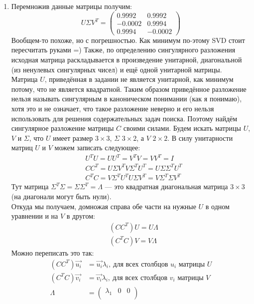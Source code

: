 \begin{solution}
\begin{enumerate}
	\item Перемножив данные матрицы получим:
	\begin{equation*}
	U\Sigma V^T = 
	\begin{pmatrix}
		0.9992 & 0.9992 \\
		-0.0002 & 0.9994 \\ 
        0.9994 & -0.0002
	\end{pmatrix}
	\end{equation*}
	Вообщем-то похоже, но с погрешностью. Как минимум по-этому SVD стоит пересчитать руками =) Также, по определению сингулярного разложения исходная матрица раскладывается в произведение унитарной, диагональной (из ненулевых сингулярных чисел) и ещё одной унитарной матрицы. Матрица $U$, приведённая в задании не является унитарной, как минимум потому, что не является квадратной. Таким образом приведённое разложение нельзя называть сингулярным в каноническом понимании (как я понимаю), хотя это и не означает, что такое разложение неверно и его нельзя использовать для решения содержательных задач поиска. Поэтому найдём сингулярное разложение матрицы $C$ своими силами.
	Будем искать матрицы $U$, $V$ и $\Sigma$, что $U$ имеет размер $3\times3$, $\Sigma$ $3\times2$, а $V$ $2 \times 2$. В силу унитарности матриц $U$ и $V$ можем записать следующее:
	\begin{align*}
		& U^T U = UU^T = V^TV = VV^T = I \\
		& CC^T = U\Sigma V^T V\Sigma^TU^T = U\Sigma\Sigma^TU^T \\
		& C^TC = V\Sigma^TU^TU\Sigma V^T = V\Sigma^T\Sigma V^T 
	\end{align*}
	Тут матрица $\Sigma^T \Sigma = \Sigma\Sigma^T = \Lambda$ --- это квадратная диагональная матрица $3\times3$ (на диагонали могут быть нули).\\
	Откуда мы получаем, домножая справа обе части на нужные $U$ в одном уравнении и на $V$ в другом:
	\begin{align*}
		& (CC^T)U = U\Lambda \\
		& (C^TC)V = V\Lambda
	\end{align*}
	Можно переписать это так:
	\begin{align*}
		(CC^T)\vec{u_i} &= \vec{u_i}\lambda_i,\ \text{для всех столбцов $u_i$ матрицы $U$} \\
		(C^TC)\vec{v_i} &= \vec{v_i}\lambda_i,\ \text{для всех столбцов $v_i$ матрицы $V$} \\
		\Lambda &= 
		\begin{pmatrix}
			\lambda_1 & 0 & 0 \\

\end{pmatrix}
\end{align*}
\end{enumerate}
\end{solution}
